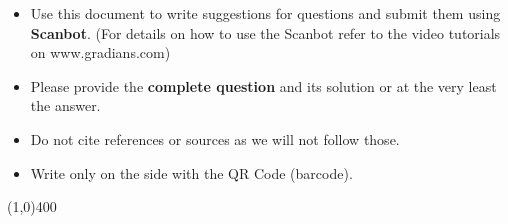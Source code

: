 \documentclass[12pt,a4paper,justified]{tufte-exam}
\begin{document}
\begin{itemize}
\item Use this document to write suggestions for questions and submit them using \textbf{Scanbot}. (For details on how to use the Scanbot refer to the video tutorials on www.gradians.com)
\item Please provide the \textbf{complete question} and its solution or at the very least the answer.
\item Do not cite references or sources as we will not follow those.
\item Write only on the side with the QR Code (barcode).
\end{itemize}
\line(1,0){400}
\end{document}
